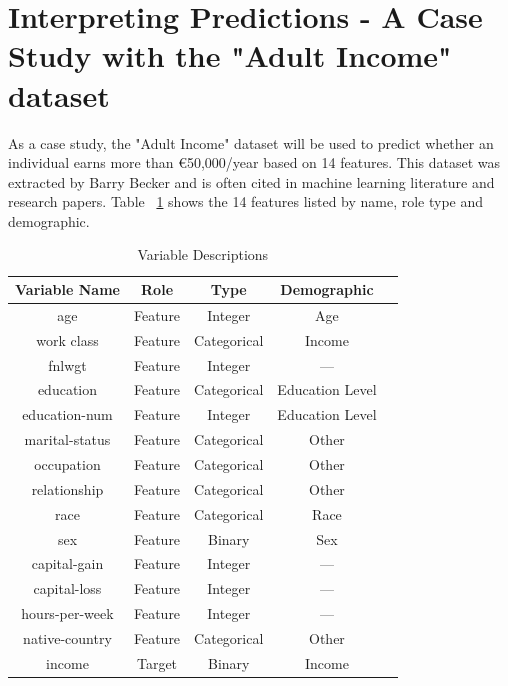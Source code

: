 \documentclass[10pt,journal,compsoc]{IEEEtran}
\begin{document}
\section{Interpreting Predictions - A Case Study with the "Adult Income" dataset}
As a case study, the "Adult Income" dataset\cite{misc_adult_2} will be used to predict whether an individual earns more than €50,000/year based on 14 features. This dataset was extracted by Barry Becker \cite{misc_adult_2} and is often cited in machine learning literature and research papers.
Table ~\ref{tab:variable-descriptions} shows the 14 features listed by name, role type and demographic.

\begin{table}[h]
    \centering
    
    \begin{tabularx}{8cm}{ccccc}
        \toprule
        \textbf{Variable Name} & \textbf{Role} & \textbf{Type} & \textbf{Demographic} \\
        \midrule
        age                    & Feature       & Integer       & Age                  \\
        work class              & Feature       & Categorical   & Income               \\
        fnlwgt                 & Feature       & Integer       & ---                  \\
        education              & Feature       & Categorical   & Education Level      \\
        education-num          & Feature       & Integer       & Education Level      \\
        marital-status         & Feature       & Categorical   & Other                \\
        occupation             & Feature       & Categorical   & Other                \\
        relationship           & Feature       & Categorical   & Other                \\
        race                   & Feature       & Categorical   & Race                 \\
        sex                    & Feature       & Binary        & Sex                  \\
        capital-gain           & Feature       & Integer       & ---                  \\
        capital-loss           & Feature       & Integer       & ---                  \\
        hours-per-week         & Feature       & Integer       & ---                  \\
        native-country         & Feature       & Categorical   & Other                \\
        income                 & Target        & Binary        & Income               \\
        \bottomrule
    \end{tabularx}
    \caption{Variable Descriptions}
    \label{tab:variable-descriptions}
\end{table}
\end{document}
